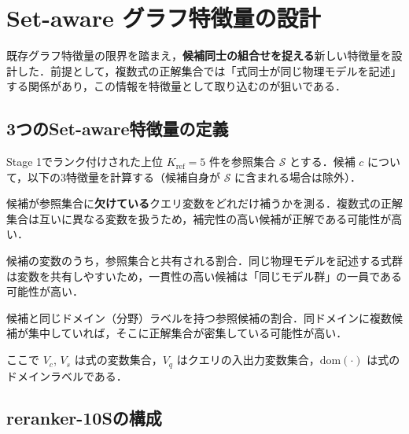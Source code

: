 \documentclass[11pt,a4paper]{ltjsarticle}
\begin{document}
\section{Set-aware グラフ特徴量の設計}

既存グラフ特徴量の限界を踏まえ，\textbf{候補同士の組合せを捉える}新しい特徴量を設計した．前提として，複数式の正解集合では「式同士が同じ物理モデルを記述」する関係があり，この情報を特徴量として取り込むのが狙いである．

\subsection{3つのSet-aware特徴量の定義}

Stage 1でランク付けされた上位 $K_{\mathrm{ref}}=5$ 件を参照集合 $\mathcal{S}$ とする．候補 $c$ について，以下の3特徴量を計算する（候補自身が $\mathcal{S}$ に含まれる場合は除外）．

\begin{description}[style=nextline, leftmargin=2em]
  \item[gComp（補完性）：$\displaystyle \frac{|(V_c \cap V_q) \setminus \bigcup_{s \in \mathcal{S}} V_s|}{|V_q|}$]
  候補が参照集合に\textbf{欠けている}クエリ変数をどれだけ補うかを測る．複数式の正解集合は互いに異なる変数を扱うため，補完性の高い候補が正解である可能性が高い．

  \item[gCoh（一貫性）：$\displaystyle \frac{|V_c \cap \bigcup_{s \in \mathcal{S}} V_s|}{|V_c|}$]
  候補の変数のうち，参照集合と共有される割合．同じ物理モデルを記述する式群は変数を共有しやすいため，一貫性の高い候補は「同じモデル群」の一員である可能性が高い．

  \item[gDom（ドメイン一致）：$\displaystyle \frac{|\{s \in \mathcal{S} : \mathrm{dom}(s) = \mathrm{dom}(c)\}|}{|\mathcal{S}|}$]
  候補と同じドメイン（分野）ラベルを持つ参照候補の割合．同ドメインに複数候補が集中していれば，そこに正解集合が密集している可能性が高い．
\end{description}

ここで $V_c$, $V_s$ は式の変数集合，$V_q$ はクエリの入出力変数集合，$\mathrm{dom}(\cdot)$ は式のドメインラベルである．

\subsection{reranker-10Sの構成}
\end{document}
